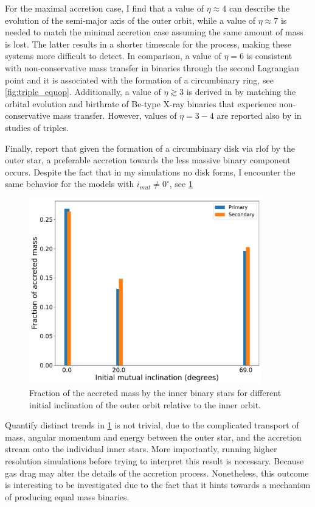 For the maximal accretion case, I find that a value of $\eta \approx 4$ can describe the evolution of the semi-major axis of the outer orbit, while a value of $\eta \approx 7$ is needed to match the minimal accretion case assuming the same amount of mass is lost. The latter results in a shorter timescale for the process, making these systems more difficult to detect. In comparison, a value of $\eta = 6$ is consistent with non-conservative mass transfer in binaries through the second Lagrangian point \citep{flannery1977origin,portegies1995formation} and it is associated with the formation of a circumbinary ring, see \cref{fig:triple_equop}. Additionally, a value of $\eta \gtrsim 3$ is derived in \cite{portegies1995formation} by matching the orbital evolution and birthrate of Be-type X-ray binaries that experience non-conservative mass transfer. However, values of $\eta = 3-4$ are reported also by \cite{de2014evolution, zwart2019triple} in studies of triples. 

Finally, \cite{zwart2019triple,leigh2020mergers} report that given the formation of a circumbinary disk via \ac{rlof} by the outer star, a preferable accretion towards the less massive binary component occurs. Despite the fact that in my simulations no disk forms, I encounter the same behavior for the models with $i_{mut} \neq 0^{\circ}$, see \cref{fig:inclination_binary_eff}
\begin{figure}[H]
    \centering
    \includegraphics[width=0.9\textwidth]{Thesis/graphs/inclination_case/incliantion_binary_acc_efficiency.pdf}
    \caption{Fraction of the accreted mass by the inner binary stars for different initial inclination of the outer orbit relative to the inner orbit.}
    \label{fig:inclination_binary_eff}
\end{figure}
Quantify distinct trends in \cref{fig:inclination_binary_eff} is not trivial, due to the complicated transport of mass, angular momentum and energy between the outer star, and the accretion stream onto the individual inner stars. More importantly, running higher resolution simulations before trying to interpret this result is necessary. Because gas drag may alter the details of the accretion process. Nonetheless, this outcome is interesting to be investigated due to the fact that it hints towards a mechanism of producing equal mass binaries. 
